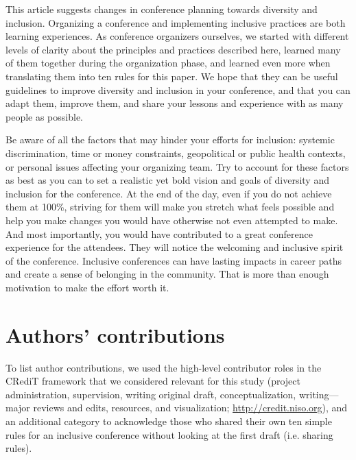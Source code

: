 \documentclass[10pt,letterpaper]{article}
\begin{document}
This article suggests changes in conference planning towards diversity and inclusion. 
Organizing a conference and implementing inclusive practices are both learning experiences.
As conference organizers ourselves, we started with different levels of clarity about the principles and practices described here, learned many of them together during the organization phase, and learned even more when translating them into ten rules for this paper. 
We hope that they can be useful guidelines to improve diversity and inclusion in your conference, and that you can adapt them, improve them, and share your lessons and experience with as many people as possible. 

Be aware of all the factors that may hinder your efforts for inclusion: systemic discrimination, time or money constraints, geopolitical or public health contexts, or personal issues affecting your organizing team. 
Try to account for these factors as best as you can to set a realistic yet bold vision and goals of diversity and inclusion for the conference.
At the end of the day, even if you do not achieve them at 100\%, striving for them will make you stretch what feels possible and help you make changes you would have otherwise not even attempted to make. 
And most importantly, you would have contributed to a great conference experience for the attendees. 
They will notice the welcoming and inclusive spirit of the conference. 
Inclusive conferences can have lasting impacts in career paths and create a sense of belonging in the community. 
That is more than enough motivation to make the effort worth it. 


\section*{Authors' contributions}

To list author contributions, we used the high-level contributor roles in the CRediT framework that we considered relevant for this study (project administration, supervision, writing original draft, conceptualization, writing—major reviews and edits, resources, and visualization; \url{http://credit.niso.org}), and an additional category to acknowledge those who shared their own ten simple rules for an inclusive conference without looking at the first draft (i.e. sharing rules).
\end{document}
